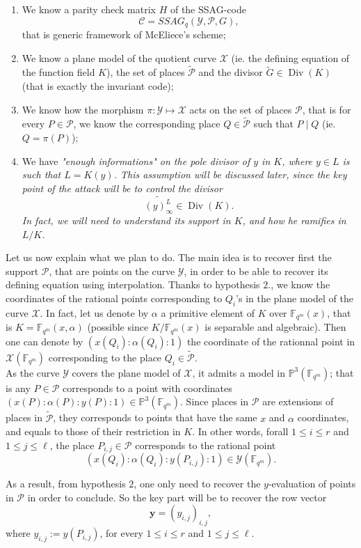 \documentclass[10pt]{article}
\newcommand{\s}{\vspace{0.3cm}}
\newcommand{\PP}{\mathbb{P}}
\newcommand{\fqm}{\mathbb{F}_{q^m}}
\newcommand{\X}{\mathcal{X}}
\newcommand{\Y}{\mathcal{Y}}
\newcommand{\PR}{\mathcal{P}}
\newcommand{\Div}{\operatorname{Div}}
\begin{document}
\begin{enumerate}
\item We know a parity check matrix $H$ of the SSAG-code  \[\mathcal{C} = SSAG_q(\Y,\PR,G),\]
that is generic framework of McEliece's scheme;
\item We know a plane model of the quotient curve $\X$ (ie. the defining equation of the function field $K$), the set of places $\tilde{\PR}$ and the divisor $\tilde{G} \in \Div(K)$ (that is exactly the invariant code);
\item We know how the morphism $\pi : \Y \longmapsto \X$ acts on the set of places $\PR$, that is for every $P \in \PR$, we know the corresponding place $Q \in \tilde{\PR}$ such that $P \mid Q$ (ie. $Q=\pi(P)$);
\item We have \it{"enough informations"} \rm on the pole divisor of $y$ in $K$, where $y \in L$ is such that $L=K(y)$. This assumption will be discussed later, since the key point of the attack will be to control the divisor 
\[\widetilde{(y)^L_{\infty}} \in \Div(K).\] 
In fact, we will need to understand its support in $K$, and how he ramifies in $L/K$.
\end{enumerate}
\s

Let us now explain what we plan to do. The main idea is to recover first the support $\PR$, that are points on the curve $\Y$, in order to be able to recover its defining equation using interpolation. Thanks to hypothesis $2.$, we know the coordinates of the rational points corresponding to $Q_i$'s in the plane model of the curve $\X$. In fact, let us denote by $\alpha$ a primitive element of $K$ over $\fqm(x)$, that is $K = \fqm(x,\alpha)$ (possible since $K/\fqm(x)$ is separable and algebraic). Then one can denote by $(x(Q_i):\alpha(Q_i):1)$ the coordinate of the rationnal point in $\X(\fqm)$ corresponding to the place $Q_i \in \tilde{\PR}$. \\

As the curve $\Y$ covers the plane model of $\X$, it admits a model in $\PP^3(\fqm)$; that is any $P \in \PR$ corresponds to a point with coordinates $(x(P):\alpha(P):y(P):1) \in \PP^3(\fqm)$. Since places in $\PR$ are extensions of places in $\tilde{\PR}$, they corresponds to points that have the same $x$ and $\alpha$ coordinates, and equals to those of their restriction in $K$. In other words, forall $1 \leq i \leq r$ and $1 \leq j \leq \ell$, the place $P_{i,j} \in \PR$ corresponds to the rational point
\[ (x(Q_i):\alpha(Q_i):y(P_{i,j}):1) \in \Y(\fqm).\]

As a result, from hypothesis $2$, one only need to recover the $y$-evaluation of points in $\PR$ in order to conclude. So the key part will be to recover the row vector
\begin{equation}
\textbf{y} = (y_{i,j})_{i,j},
\end{equation}
where $y_{i,j} := y(P_{i,j})$, for every $1 \leq i \leq r$ and $1 \leq j \leq \ell$.
\end{document}
